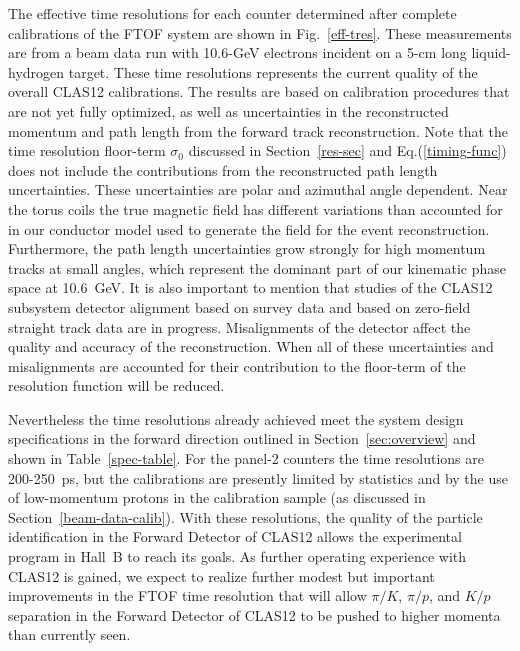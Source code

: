 \documentclass{elsart}
\begin{document}
The effective time resolutions for each counter determined after complete calibrations of the FTOF
system are shown in Fig.~\ref{eff-tres}. These measurements are from a beam data run with 10.6-GeV
electrons incident on a 5-cm long liquid-hydrogen target. These time resolutions represents the current
quality of the overall CLAS12 calibrations. The results are based on calibration procedures that are not
yet fully optimized, as well as uncertainties in the reconstructed momentum and path length from the
forward track reconstruction. Note that the time resolution floor-term $\sigma_0$ discussed in
Section~\ref{res-sec} and Eq.(\ref{timing-func}) does not include the contributions from the
reconstructed path length uncertainties. These uncertainties are polar and azimuthal angle dependent.
Near the torus coils the true magnetic field has different variations than accounted for in our conductor
model used to generate the field for the event reconstruction. Furthermore, the path length uncertainties
grow strongly for high momentum tracks at small angles, which represent the dominant part of our kinematic
phase space at 10.6~GeV. It is also important to mention that studies of the CLAS12 subsystem detector
alignment based on survey data and based on zero-field straight track data are in progress. Misalignments
of the detector affect the quality and accuracy of the reconstruction. When all of these uncertainties and
misalignments are accounted for their contribution to the floor-term of the resolution function will be
reduced.

Nevertheless the time resolutions already achieved meet the system design specifications in the forward
direction outlined in Section~\ref{sec:overview} and shown in Table~\ref{spec-table}. For the panel-2
counters the time resolutions are 200-250~ps, but the calibrations are presently limited by statistics and by
the use of low-momentum protons in the calibration sample (as discussed in Section~\ref{beam-data-calib}). 
With these resolutions, the quality of the particle identification in the Forward Detector of CLAS12 allows
the experimental program in Hall~B to reach its goals. As further operating experience with CLAS12 is
gained, we expect to realize further modest but important improvements in the FTOF time resolution that
will allow $\pi/K$, $\pi/p$, and $K/p$ separation in the Forward Detector of CLAS12 to be pushed to higher
momenta than currently seen.
\end{document}
